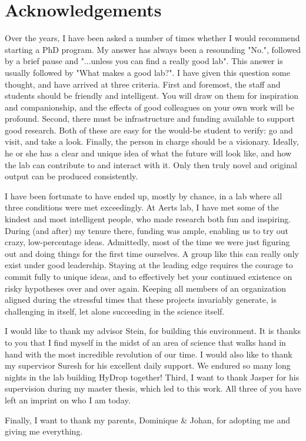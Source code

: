 \chapter*{Acknowledgements}

Over the years, I have been asked a number of times whether I would recommend starting a PhD program. My answer has always been a resounding "No.", followed by a brief pause and "...unless you can find a really good lab". This answer is usually followed by "What makes a good lab?". I have given this question some thought, and have arrived at three criteria. First and foremost, the staff and students should be friendly and intelligent. You will draw on them for inspiration and companionship, and the effects of good colleagues on your own work will be profound. Second, there must be infrastructure and funding available to support good research. Both of these are easy for the would-be student to verify: go and visit, and take a look. Finally, the person in charge should be a visionary. Ideally, he or she has a clear and unique idea of what the future will look like, and how the lab can contribute to and interact with it. Only then truly novel and original output can be produced consistently.

I have been fortunate to have ended up, mostly by chance, in a lab where all three conditions were met exceedingly. At Aerts lab, I have met some of the kindest and most intelligent people, who made research both fun and inspiring. During (and after) my tenure there, funding was ample, enabling us to try out crazy, low-percentage ideas. Admittedly, most of the time we were just figuring out and doing things for the first time ourselves. A group like this can really only exist under good leadership. Staying at the leading edge requires the courage to commit fully to unique ideas, and to effectively bet your continued existence on risky hypotheses over and over again. Keeping all members of an organization aligned during the stressful times that these projects invariably generate, is challenging in itself, let alone succeeding in the science itself.

I would like to thank my advisor Stein, for building this environment. It is thanks to you that I find myself in the midst of an area of science that walks hand in hand with the most incredible revolution of our time. I would also like to thank my supervisor Suresh for his excellent daily support. We endured so many long nights in the lab building HyDrop together! Third, I want to thank Jasper for his supervision during my master thesis, which led to this work. All three of you have left an imprint on who I am today.

Finally, I want to thank my parents, Dominique \& Johan, for adopting me and giving me everything.